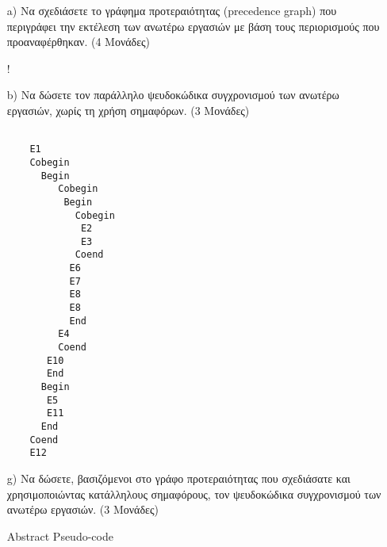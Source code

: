 \documentclass{article}
\begin{document}
\begin{itemize}
    \item [a)]Να σχεδιάσετε το γράφημα προτεραιότητας (precedence graph) που περιγράφει την εκτέλεση των ανωτέρω εργασιών με βάση τους περιορισμούς που προαναφέρθηκαν. (4 Μονάδες)
    \newpage
     \begin{center}
    \resizebox {.7\textwidth } {!} {
     }
    
   \end{center}
    \newpage
    \item [b)] Να δώσετε τον παράλληλο ψευδοκώδικα συγχρονισμού των ανωτέρω εργασιών, χωρίς τη χρήση σημαφόρων. (3 Μονάδες)
    \\
    \begin{otherlanguage}{english}
      \begin{lstlisting}
        
    E1
    Cobegin
      Begin
         Cobegin
          Begin
            Cobegin
             E2
             E3
            Coend
           E6
           E7
           E8
           E8
           End
         E4
         Coend
       E10
       End
      Begin
       E5
       E11
      End
    Coend
    E12
     \end{lstlisting}
     \end{otherlanguage}
  \item [g)] Να δώσετε, βασιζόμενοι στο γράφο προτεραιότητας που σχεδιάσατε και χρησιμοποιώντας κατάλληλους σημαφόρους, τον ψευδοκώδικα συγχρονισμού των ανωτέρω εργασιών. (3 Μονάδες)
  \\
     
     \begin{otherlanguage}{english}

        Abstract Pseudo-code
        

\end{otherlanguage}
\end{itemize}
\end{document}
